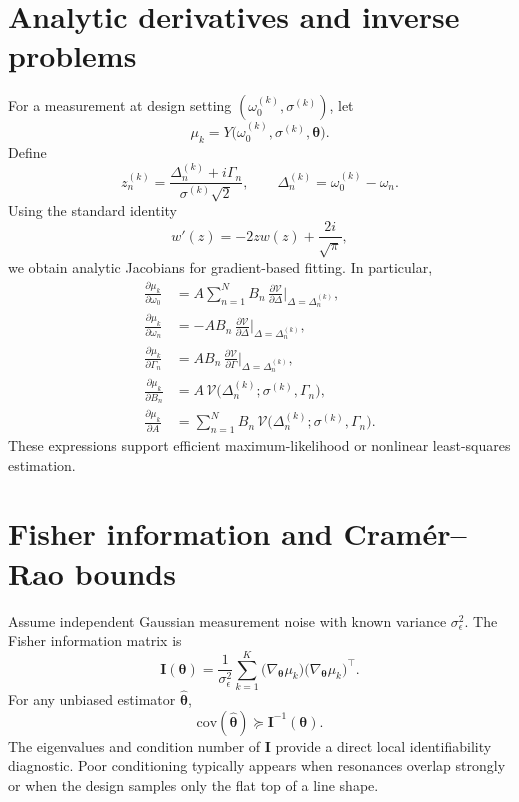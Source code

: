 \documentclass[aps,pre,amsmath,amssymb]{revtex4-2}
\begin{document}
\section{Analytic derivatives and inverse problems}
For a measurement at design setting $(\omega_0^{(k)},\sigma^{(k)})$, let
\begin{equation}
\mu_k = Y\bigl(\omega_0^{(k)},\sigma^{(k)},\bm{\theta}\bigr).
\end{equation}
Define
\begin{equation}
z_n^{(k)}=\frac{\Delta_n^{(k)}+i\Gamma_n}{\sigma^{(k)}\sqrt{2}},
\qquad
\Delta_n^{(k)}=\omega_0^{(k)}-\omega_n.
\end{equation}
Using the standard identity
\begin{equation}
w'(z)=-2zw(z)+\frac{2i}{\sqrt{\pi}},
\label{eq:wprime}
\end{equation}
we obtain analytic Jacobians for gradient-based fitting. In particular,
\begin{align}
\frac{\partial \mu_k}{\partial \omega_0}
&=A\sum_{n=1}^{N}B_n\,\frac{\partial \mathcal V}{\partial \Delta}\Big|_{\Delta=\Delta_n^{(k)}},
\\
\frac{\partial \mu_k}{\partial \omega_n}
&=-AB_n\,\frac{\partial \mathcal V}{\partial \Delta}\Big|_{\Delta=\Delta_n^{(k)}},
\\
\frac{\partial \mu_k}{\partial \Gamma_n}
&=AB_n\,\frac{\partial \mathcal V}{\partial \Gamma}\Big|_{\Delta=\Delta_n^{(k)}},
\\
\frac{\partial \mu_k}{\partial B_n}
&=A\,\mathcal V\bigl(\Delta_n^{(k)};\sigma^{(k)},\Gamma_n\bigr),
\\
\frac{\partial \mu_k}{\partial A}
&=\sum_{n=1}^{N}B_n\,\mathcal V\bigl(\Delta_n^{(k)};\sigma^{(k)},\Gamma_n\bigr).
\end{align}
These expressions support efficient maximum-likelihood or nonlinear least-squares estimation.

\section{Fisher information and Cram\'er--Rao bounds}
Assume independent Gaussian measurement noise with known variance $\sigma_\epsilon^2$. The Fisher information matrix is
\begin{equation}
\mathbf I(\bm{\theta})
=\frac{1}{\sigma_\epsilon^2}\sum_{k=1}^{K}
\bigl(\nabla_{\!\bm{\theta}}\mu_k\bigr)
\bigl(\nabla_{\!\bm{\theta}}\mu_k\bigr)^{\top}.
\label{eq:fim}
\end{equation}
For any unbiased estimator $\hat{\bm{\theta}}$,
\begin{equation}
\mathrm{cov}(\hat{\bm{\theta}})\succeq \mathbf I^{-1}(\bm{\theta}).
\label{eq:crlb}
\end{equation}
The eigenvalues and condition number of $\mathbf I$ provide a direct local identifiability diagnostic. Poor conditioning typically appears when resonances overlap strongly or when the design samples only the flat top of a line shape.
\end{document}
